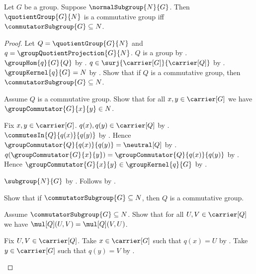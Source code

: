 \begin{theorem}\label{quotient_group_commutative_iff_commutator_subgroup}
    Let $G$ be a group.
    Suppose $\normalSubgroup{N}{G}$.
    Then $\quotientGroup{G}{N}$ is a commutative group iff
        $\commutatorSubgroup{G}\subseteq N$.
\end{theorem}
\begin{proof}
    Let $Q=\quotientGroup{G}{N}$ and
        $q=\groupQuotientProjection{G}{N}$.
    $Q$ is a group by .
    $\groupHom{q}{G}{Q}$ by .
    $q\in\surj{\carrier[G]}{\carrier[Q]}$ by
        .
    $\groupKernel{q}{G}=N$ by
        .
    Show that if $Q$ is a commutative group, then
        $\commutatorSubgroup{G}\subseteq N$.
    \begin{subproof}
        Assume $Q$ is a commutative group.
        Show that for all $x,y\in\carrier[G]$ we have
            $\groupCommutator{G}{x}{y}\in N$.
        \begin{subproof}
            Fix $x,y\in\carrier[G]$.
            $q(x),q(y)\in\carrier[Q]$ by
                .
            $\commutesIn{Q}{q(x)}{q(y)}$ by
                .
            Hence $\groupCommutator{Q}{q(x)}{q(y)}=\neutral[Q]$ by
                .
            $q(\groupCommutator{G}{x}{y})=
                \groupCommutator{Q}{q(x)}{q(y)}$ by
                .
            Hence $\groupCommutator{G}{x}{y}\in
                \groupKernel{q}{G}$ by
                .
        \end{subproof}
        $\subgroup{N}{G}$ by .
        Follows by .
    \end{subproof}
    Show that if $\commutatorSubgroup{G}\subseteq N$, then
        $Q$ is a commutative group.
    \begin{subproof}
        Assume $\commutatorSubgroup{G}\subseteq N$.
        Show that for all $U,V\in\carrier[Q]$ we have
            $\mul[Q](U,V)=\mul[Q](V,U)$.
        \begin{subproof}
            Fix $U,V\in\carrier[Q]$.
            Take $x\in\carrier[G]$ such that $q(x)=U$ by
                .
            Take $y\in\carrier[G]$ such that $q(y)=V$ by
                .

\end{subproof}
\end{subproof}
\end{proof}
